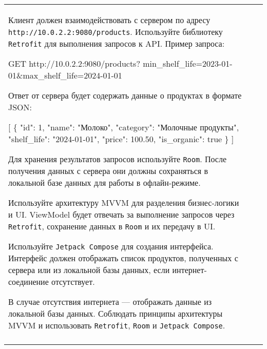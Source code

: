 \documentclass[a4paper]{article}
\begin{document}
\begin{tabular}{!{\vrule width 2pt}p{5cm}|p{6cm}|p{4cm}!{\vrule width 2pt}}
{\begin{minipage}{16cm}
\begin{enumerate}
Клиент должен взаимодействовать с сервером по адресу \texttt{http://10.0.2.2:9080/products}. Используйте библиотеку \texttt{Retrofit} для выполнения запросов к API. Пример запроса:


GET http://10.0.2.2:9080/products?
min\_shelf\_life=2023-01-01\&max\_shelf\_life=2024-01-01


Ответ от сервера будет содержать данные о продуктах в формате JSON:


[
  \{
    "id": 1,
    "name": "Молоко",
    "category": "Молочные продукты",
    "shelf\_life": "2024-01-01",
    "price": 100.50,
    "is\_organic": true
  \}
]


Для хранения результатов запросов используйте \texttt{Room}. После получения данных с сервера они должны сохраняться в локальной базе данных для работы в офлайн-режиме.

Используйте архитектуру MVVM для разделения бизнес-логики и UI. ViewModel будет отвечать за выполнение запросов через \texttt{Retrofit}, сохранение данных в \texttt{Room} и их передачу в UI.

Используйте \texttt{Jetpack Compose} для создания интерфейса. Интерфейс должен отображать список продуктов, полученных с сервера или из локальной базы данных, если интернет-соединение отсутствует.

В случае отсутствия интернета — отображать данные из локальной базы данных.
Соблюдать принципы архитектуры MVVM и использовать \texttt{Retrofit}, \texttt{Room} и \texttt{Jetpack Compose}. 
\end{enumerate}

\vspace{0.2cm}
    
\end{minipage}
}
\\
\end{tabular}

\newpage
\end{document}
